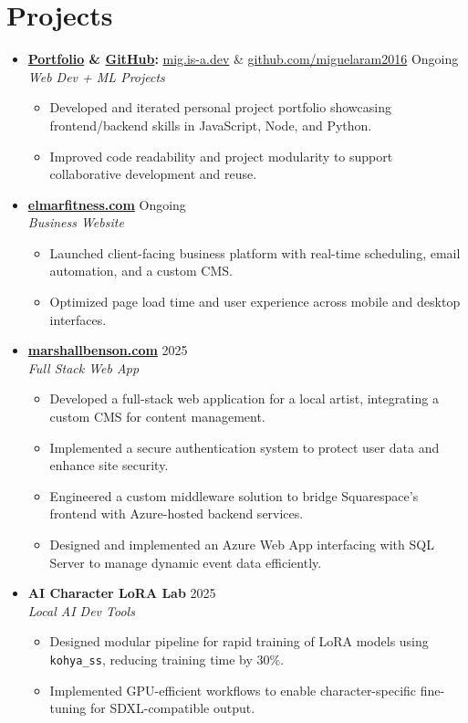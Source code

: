 \documentclass[letterpaper,10pt]{article}
\newcommand{\resumeItem}[1]{\item\hspace{5pt}\small{#1}}
\begin{document}
\section*{Projects}
\begin{itemize}
  \item[]
    \textbf{\href{https://mig.is-a.dev}{Portfolio} \& \href{https://github.com/miguelaram2016}{GitHub}:} \href{https://mig.is-a.dev}{mig.is-a.dev} \& \href{https://github.com/miguelaram2016}{github.com/miguelaram2016} \hfill Ongoing \\
    \textit{Web Dev + ML Projects}
    \begin{itemize}
      \resumeItem{Developed and iterated personal project portfolio showcasing frontend/backend skills in JavaScript, Node, and Python.}
      \resumeItem{Improved code readability and project modularity to support collaborative development and reuse.}
    \end{itemize}

  \item[]
    \textbf{\href{https://elmarfitness.com}{elmarfitness.com}} \hfill Ongoing \\
    \textit{Business Website}
    \begin{itemize}
      \resumeItem{Launched client-facing business platform with real-time scheduling, email automation, and a custom CMS.}
      \resumeItem{Optimized page load time and user experience across mobile and desktop interfaces.}
    \end{itemize}

  \item[]
    \textbf{\href{https://marshallbenson.com}{marshallbenson.com}} \hfill 2025 \\
    \textit{Full Stack Web App}
    \begin{itemize}
      \resumeItem{Developed a full-stack web application for a local artist, integrating a custom CMS for content management.}
      \resumeItem{Implemented a secure authentication system to protect user data and enhance site security.}
      \resumeItem{Engineered a custom middleware solution to bridge Squarespace's frontend with Azure-hosted backend services.}
      \resumeItem{Designed and implemented an Azure Web App interfacing with SQL Server to manage dynamic event data efficiently.}
    \end{itemize}
    
  \item[]
    \textbf{AI Character LoRA Lab} \hfill 2025 \\
    \textit{Local AI Dev Tools}
    \begin{itemize}
      \resumeItem{Designed modular pipeline for rapid training of LoRA models using \texttt{kohya\_ss}, reducing training time by 30\%.}
      \resumeItem{Implemented GPU-efficient workflows to enable character-specific fine-tuning for SDXL-compatible output.}
    \end{itemize}
\end{itemize}
\end{document}
